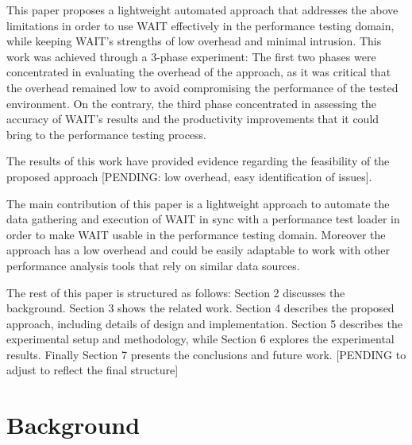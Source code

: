 \documentclass[runningheads,a4paper]{llncs}
\begin{document}
This paper proposes a lightweight automated approach that addresses the above
limitations in order to use WAIT effectively in the performance testing domain, 
while keeping WAIT's strengths of low overhead and minimal intrusion. This work
was achieved through a 3-phase experiment: The first two phases were concentrated 
in evaluating the overhead of the approach, as it was critical that the overhead remained low to avoid
compromising the performance of the tested environment. On the contrary, the third 
phase concentrated in assessing the accuracy of WAIT's results and the productivity 
improvements that it could bring to the performance testing process. 

The results of this work have provided evidence regarding the feasibility of the
proposed approach [PENDING: low overhead, easy identification of issues].

The main contribution of this paper is a lightweight approach to automate the data 
gathering and execution of WAIT in sync with a performance test loader in
order to make WAIT usable in the performance testing domain. Moreover the
approach has a low overhead and could be easily adaptable to work with other
performance analysis tools that rely on similar data sources.

The rest of this paper is structured as follows: Section 2 discusses the
background. Section 3 shows the related work. Section 4 describes the proposed
approach, including details of design and implementation. Section 5 describes
the experimental setup and methodology, while Section 6 explores the
experimental results. Finally Section 7 presents the conclusions and future
work. [PENDING to adjust to reflect the final structure]



\section{Background}
\end{document}
